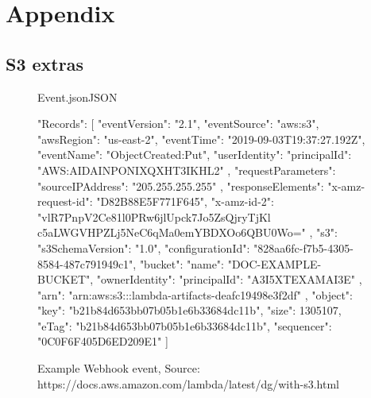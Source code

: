 \chapter{Appendix}

\section{S3 extras}
\begin{figure}
\begin{codeblock}{Event.json}{JSON}
\begin{javacode}
	{
		"Records": [
		{
			"eventVersion": "2.1",
			"eventSource": "aws:s3",
			"awsRegion": "us-east-2",
			"eventTime": "2019-09-03T19:37:27.192Z",
			"eventName": "ObjectCreated:Put",
			"userIdentity": {
				"principalId": "AWS:AIDAINPONIXQXHT3IKHL2"
			},
			"requestParameters": {
				"sourceIPAddress": "205.255.255.255"
			},
			"responseElements": {
				"x-amz-request-id": "D82B88E5F771F645",
				"x-amz-id-2": "vlR7PnpV2Ce81l0PRw6jlUpck7Jo5ZsQjryTjKl
					c5aLWGVHPZLj5NeC6qMa0emYBDXOo6QBU0Wo="
			},
			"s3": {
				"s3SchemaVersion": "1.0",
				"configurationId": "828aa6fc-f7b5-4305-8584-487c791949c1",
				"bucket": {
					"name": "DOC-EXAMPLE-BUCKET",
					"ownerIdentity": {
						"principalId": "A3I5XTEXAMAI3E"
					},
					"arn": "arn:aws:s3:::lambda-artifacts-deafc19498e3f2df"
				},
				"object": {
					"key": "b21b84d653bb07b05b1e6b33684dc11b",
					"size": 1305107,
					"eTag": "b21b84d653bb07b05b1e6b33684dc11b",
					"sequencer": "0C0F6F405D6ED209E1"
				}
			}
		}
		]
	}
	\end{javacode}
\end{codeblock}
\caption{Example Webhook event, Source: https://docs.aws.amazon.com/lambda/latest/dg/with-s3.html}
\label{appendix:webhook}
\end{figure}

\pagebreak

